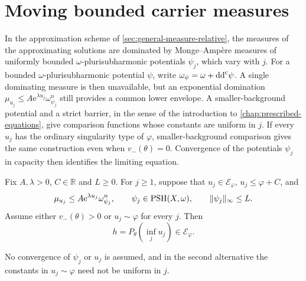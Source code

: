 \section{Moving bounded carrier measures}

In the approximation scheme of \cref{sec:general-measure-relative}, the measures of the approximating solutions are dominated by Monge--Amp\`ere measures of uniformly bounded $\omega$-plurisubharmonic potentials $\psi_j$, which vary with $j$. For a bounded $\omega$-plurisubharmonic potential $\psi$, write $\omega_\psi=\omega+\mathrm{dd}^{\mathrm{c}}\psi$. A single dominating measure is then unavailable, but an exponential domination $\mu_{u_j}\leq A\mathrm{e}^{\lambda u_j}\omega_{\psi_j}^n$ still provides a common lower envelope. A smaller-background potential and a strict barrier, in the sense of the introduction to \cref{chap:prescribed-equations}, give comparison functions whose constants are uniform in $j$. If every $u_j$ has the ordinary singularity type of $\varphi$, smaller-background comparison gives the same construction even when $v_-(\theta)=0$. Convergence of the potentials $\psi_j$ in capacity then identifies the limiting equation.

\begin{proposition}\label{prop:exponential-common-rooftop}
Fix $A,\lambda>0$, $C\in\mathbb R$ and $L\geq0$. For $j\geq1$, suppose that $u_j\in\mathcal E_\varphi$, $u_j\leq\varphi+C$, and
\begin{equation}\label{eq:exponential-bounded-reference-domination}
 \mu_{u_j}\leq A \mathrm{e}^{\lambda u_j}\omega_{\psi_j}^n,
 \qquad \psi_j\in\mathrm{PSH}(X,\omega),\qquad
 \|\psi_j\|_\infty\leq L.
\end{equation}
Assume either $v_-(\theta)>0$ or $u_j\sim\varphi$ for every $j$. Then
\[
 h=P_\theta\left(\inf_j u_j\right)\in\mathcal E_\varphi.
\]
\end{proposition}

No convergence of $\psi_j$ or $u_j$ is assumed, and in the second alternative the constants in $u_j\sim\varphi$ need not be uniform in $j$.

